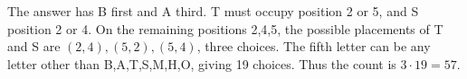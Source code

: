 The answer has B first and A third. T must occupy position 2 or 5, and S position 2 or 4. On the remaining positions 2,4,5, the possible placements of T and S are $(2,4),(5,2),(5,4)$, three choices. The fifth letter can be any letter other than B,A,T,S,M,H,O, giving 19 choices. Thus the count is $ 3\cdot19=\boxed{57}$.
